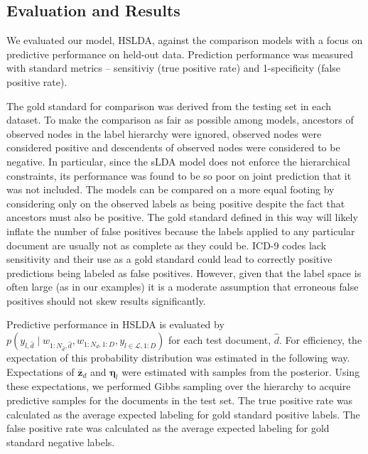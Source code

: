 \subsection{Evaluation and Results}


We evaluated our model, HSLDA, against the comparison models with a focus on
predictive performance on held-out data. Prediction performance was measured
with standard metrics -- sensitiviy (true positive rate) and 1-specificity
(false positive rate). 

The gold standard for comparison was derived from the testing set in each
dataset. To make the comparison as fair as possible among models, ancestors of
observed 
nodes in the label hierarchy were ignored, observed nodes were considered
positive and descendents of observed nodes were considered to be negative. In
particular, since the sLDA model does not enforce the hierarchical constraints,
its performance was found to be so poor on joint prediction that it was not
included. 
The models can be compared on a more equal footing by considering only on the observed labels
as being positive despite the fact that ancestors must also be positive. The gold standard 
defined in this way will likely inflate the number of
false positives because the labels applied to any particular document are usually not as complete as they could be. 
ICD-9 codes lack sensitivity and their use as a
gold standard could lead to correctly positive predictions being labeled as false positives\citep{Birmetal2005}.
However, given that the label space is often large (as in our examples) it is a moderate assumption that
erroneous false positives should not skew results significantly.

Predictive performance in HSLDA is evaluated by $p\left(y_{l,\hat{d}}\mid w_{1:N_{\hat{d}},\hat{d}}, w_{1:N_d,1:D},  y_{l\in\mathcal{L},1:D}\right)$ 
for each test document, $\hat{d}$. For efficiency,
the expectation of this probability distribution was estimated in the following way. Expectations
of $\mathbf{\bar{z}}_d$ and $\boldsymbol{\eta}_l$ were estimated with samples from the posterior.
Using these expectations, we performed Gibbs sampling over the hierarchy to acquire predictive
samples for the documents in the test set. The true positive rate was calculated as the
 average expected labeling for gold standard positive labels. The false positive rate was calculated
as the average expected labeling for gold standard negative labels.

